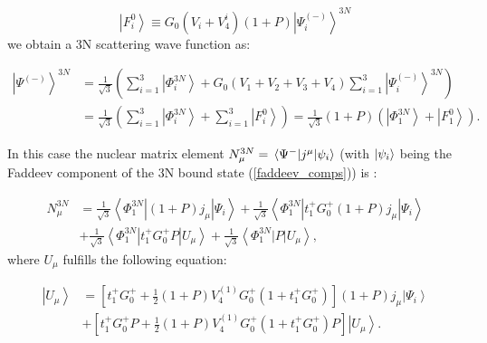     \begin{equation}
        \left|F_i^0\right\rangle \equiv G_0\left(V_i+V_4^{i}\right)(1+P)\left|\Psi_i^{(-)}\right\rangle^{3 N}
        \label{faddeev_3n}
    \end{equation}
    we obtain a 3N scattering wave function as:

    \begin{equation}
        \begin{aligned}
            \left|\Psi^{(-)}\right\rangle^{3 N} & =\frac{1}{\sqrt{3}}\left(\sum_{i=1}^3\left|\Phi_i^{3 N}\right\rangle+G_0\left(V_1+V_2+V_3+V_4\right) \sum_{i=1}^3\left|\Psi_i^{(-)}\right\rangle^{3 N}\right) \\
            & =\frac{1}{\sqrt{3}}\left(\sum_{i=1}^3\left|\Phi_i^{3 N}\right\rangle+\sum_{i=1}^3\left|F_i^0\right\rangle\right)
            =\frac{1}{\sqrt{3}}(1+P)\left(\left|\Phi_1^{3 N}\right\rangle+\left|F_1^0\right\rangle\right) .
        \end{aligned}
        \label{3n_scat_psi}
    \end{equation}

    In this case the nuclear matrix element 
    $N_\mu^{3 N} = \matrixel{\Psi^-}{j^\mu}{\psi_i}$ 
    (with $\ket{\psi_i}$ being the Faddeev component of the 3N bound state (\ref{faddeev_comps})) is
    \cite{GLOCKLE_report_1996, skibinski_prc_2003, Skibiski2005}:

    \begin{equation}
        \begin{aligned}
            N_\mu^{3 N} & =\frac{1}{\sqrt{3}}\left\langle\Phi_1^{3 N}\left|(1+P) j_\mu\right| \Psi_i\right\rangle+\frac{1}{\sqrt{3}}\left\langle\Phi_1^{3 N}\left|t_1^{+} G_0^{+}(1+P) j_\mu\right| \Psi_i\right\rangle \\
            & +\frac{1}{\sqrt{3}}\left\langle\Phi_1^{3 N}\left|t_1^{+} G_0^{+} P\right| U_\mu\right\rangle+\frac{1}{\sqrt{3}}\left\langle\Phi_1^{3 N}|P| U_\mu\right\rangle,
            \end{aligned}
        \label{3n_matrix}
    \end{equation}
    where $ U_\mu$ fulfills the following equation:

    \begin{equation}
        \begin{aligned}
            \left|U_\mu\right\rangle & =\left[t_1^{+} G_0^{+}+\frac{1}{2}(1+P) V_4^{(1)} G_0^{+}\left(1+t_1^{+} G_0^{+}\right)\right](1+P) j_\mu\left|\Psi_i\right\rangle \\
            & +\left[t_1^{+} G_0^{+} P+\frac{1}{2}(1+P) V_4^{(1)} G_0^{+}\left(1+t_1^{+} G_0^{+}\right) P\right]\left|U_\mu\right\rangle.
            \end{aligned}
        \label{u_mu}
    \end{equation}

